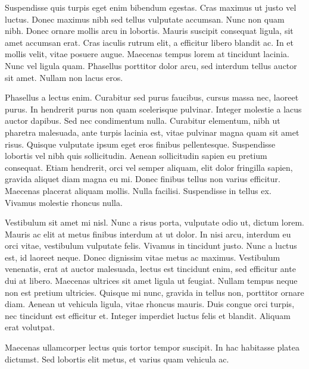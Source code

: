 \documentclass[a4paper,twoside,notitlepage,openright,11pt]{report}
\begin{document}
Suspendisse quis turpis eget enim bibendum egestas. Cras maximus ut justo vel luctus. Donec maximus nibh sed tellus vulputate accumsan. Nunc non quam nibh. Donec ornare mollis arcu in lobortis. Mauris suscipit consequat ligula, sit amet accumsan erat. Cras iaculis rutrum elit, a efficitur libero blandit ac. In et mollis velit, vitae posuere augue. Maecenas tempus lorem at tincidunt lacinia. Nunc vel ligula quam. Phasellus porttitor dolor arcu, sed interdum tellus auctor sit amet. Nullam non lacus eros.

Phasellus a lectus enim. Curabitur sed purus faucibus, cursus massa nec, laoreet purus. In hendrerit purus non quam scelerisque pulvinar. Integer molestie a lacus auctor dapibus. Sed nec condimentum nulla. Curabitur elementum, nibh ut pharetra malesuada, ante turpis lacinia est, vitae pulvinar magna quam sit amet risus. Quisque vulputate ipsum eget eros finibus pellentesque. Suspendisse lobortis vel nibh quis sollicitudin. Aenean sollicitudin sapien eu pretium consequat. Etiam hendrerit, orci vel semper aliquam, elit dolor fringilla sapien, gravida aliquet diam magna eu mi. Donec finibus tellus non varius efficitur. Maecenas placerat aliquam mollis. Nulla facilisi. Suspendisse in tellus ex. Vivamus molestie rhoncus nulla.

Vestibulum sit amet mi nisl. Nunc a risus porta, vulputate odio ut, dictum lorem. Mauris ac elit at metus finibus interdum at ut dolor. In nisi arcu, interdum eu orci vitae, vestibulum vulputate felis. Vivamus in tincidunt justo. Nunc a luctus est, id laoreet neque. Donec dignissim vitae metus ac maximus. Vestibulum venenatis, erat at auctor malesuada, lectus est tincidunt enim, sed efficitur ante dui at libero. Maecenas ultrices sit amet ligula ut feugiat. Nullam tempus neque non est pretium ultricies. Quisque mi nunc, gravida in tellus non, porttitor ornare diam. Aenean ut vehicula ligula, vitae rhoncus mauris. Duis congue orci turpis, nec tincidunt est efficitur et. Integer imperdiet luctus felis et blandit. Aliquam erat volutpat.

Maecenas ullamcorper lectus quis tortor tempor suscipit. In hac habitasse platea dictumst. Sed lobortis elit metus, et varius quam vehicula ac.



{}

\printindex
\markboth{\MakeUppercase{\indexname}}{}



\renewcommand{\nomname}{Conventions}
{}

\printnomenclature[8em]



\newpage
\end{document}
